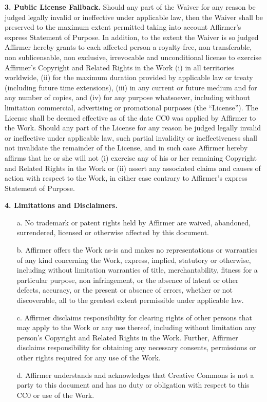 \documentclass[letterpaper,twocolumn,10pt,openany,oneside,final,fleqn]{memoir}
\begin{document}
\textbf{3. Public License Fallback.} Should any part of the Waiver for any reason
be judged legally invalid or ineffective under applicable law, then the
Waiver shall be preserved to the maximum extent permitted taking into
account Affirmer's express Statement of Purpose. In addition, to the
extent the Waiver is so judged Affirmer hereby grants to each affected
person a royalty-free, non transferable, non sublicensable, non exclusive,
irrevocable and unconditional license to exercise Affirmer's Copyright and
Related Rights in the Work (i) in all territories worldwide, (ii) for the
maximum duration provided by applicable law or treaty (including future
time extensions), (iii) in any current or future medium and for any number
of copies, and (iv) for any purpose whatsoever, including without
limitation commercial, advertising or promotional purposes (the
``License''). The License shall be deemed effective as of the date CC0 was
applied by Affirmer to the Work. Should any part of the License for any
reason be judged legally invalid or ineffective under applicable law, such
partial invalidity or ineffectiveness shall not invalidate the remainder
of the License, and in such case Affirmer hereby affirms that he or she
will not (i) exercise any of his or her remaining Copyright and Related
Rights in the Work or (ii) assert any associated claims and causes of
action with respect to the Work, in either case contrary to Affirmer's
express Statement of Purpose.

\textbf{4. Limitations and Disclaimers.}

\begin{itemize}
\item[a.]{No trademark or patent rights held by Affirmer are waived, abandoned,
    surrendered, licensed or otherwise affected by this document.}
\item[b.]{Affirmer offers the Work as-is and makes no representations or
    warranties of any kind concerning the Work, express, implied,
    statutory or otherwise, including without limitation warranties of
    title, merchantability, fitness for a particular purpose, non
    infringement, or the absence of latent or other defects, accuracy, or
    the present or absence of errors, whether or not discoverable, all to
    the greatest extent permissible under applicable law.}
\item[c.]{Affirmer disclaims responsibility for clearing rights of other persons
    that may apply to the Work or any use thereof, including without
    limitation any person's Copyright and Related Rights in the Work.
    Further, Affirmer disclaims responsibility for obtaining any necessary
    consents, permissions or other rights required for any use of the
    Work.}
\item[d.]{Affirmer understands and acknowledges that Creative Commons is not a
    party to this document and has no duty or obligation with respect to
    this CC0 or use of the Work.}
\end{itemize}
\end{document}
